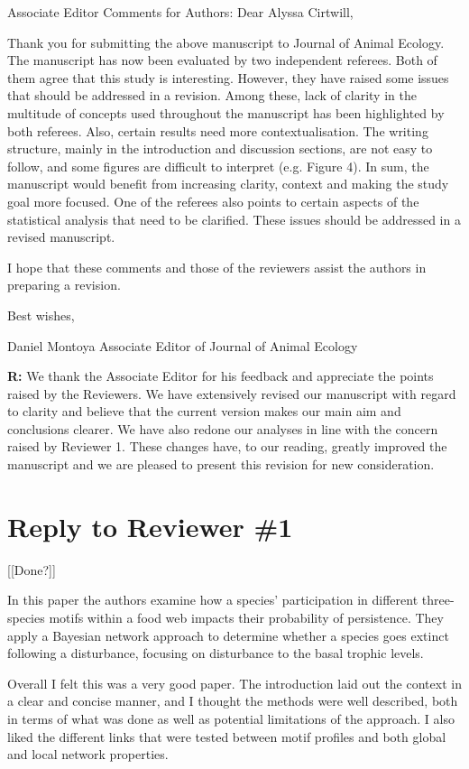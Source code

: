 \documentclass[12pt]{article}
\newenvironment{refquote}{\bigskip \begin{it}}{\end{it}\medskip}
\begin{document}
    \begin{refquote}

        Associate Editor Comments for Authors:
        Dear Alyssa Cirtwill,

        Thank you for submitting the above manuscript to Journal of Animal Ecology. The manuscript has now been evaluated by two independent referees. Both of them agree that this study is interesting. However, they have raised some issues that should be addressed in a revision. Among these, lack of clarity in the multitude of concepts used throughout the manuscript has been highlighted by both referees. Also, certain results need more contextualisation. The writing structure, mainly in the introduction and discussion sections, are not easy to follow, and some figures are difficult to interpret (e.g. Figure 4). In sum, the manuscript would benefit from increasing clarity, context and making the study goal more focused. One of the referees also points to certain aspects of the statistical analysis that need to be clarified. These issues should be addressed in a revised manuscript.

        I hope that these comments and those of the reviewers assist the authors in preparing a revision.

        Best wishes,

        Daniel Montoya
        Associate Editor of Journal of Animal Ecology

    \end{refquote}


    \textbf{R:} We thank the Associate Editor for his feedback and appreciate the points raised by the Reviewers. We have extensively revised our manuscript with regard to clarity and believe that the current version makes our main aim and conclusions clearer. We have also redone our analyses in line with the concern raised by Reviewer 1. These changes have, to our reading, greatly improved the manuscript and we are pleased to present this revision for new consideration.


\clearpage

\section*{Reply to Reviewer \#1} [[Done?]]

    \begin{refquote}

        In this paper the authors examine how a species' participation in different three-species motifs within a food web impacts their probability of persistence. They apply a Bayesian network approach to determine whether a species goes extinct following a disturbance, focusing on disturbance to the basal trophic levels.

        Overall I felt this was a very good paper. The introduction laid out the context in a clear and concise manner, and I thought the methods were well described, both in terms of what was done as well as potential limitations of the approach. I also liked the different links that were tested between motif profiles and both global and local network properties. 

    \end{refquote}
\end{document}
